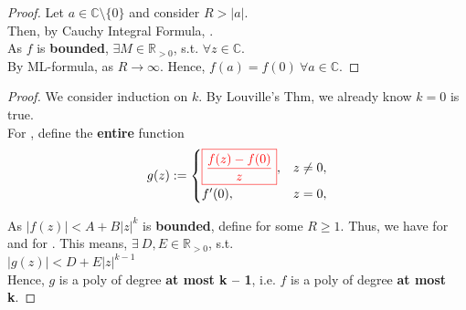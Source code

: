 \documentclass[12pt,a4paper]{article}
\begin{document}
\begin{proof}
  Let $a \in \mathbb{C} \setminus \{0\}$ and consider $R > |a|$. \\

  \noindent Then, by Cauchy Integral Formula, . \\

  \noindent As $f$ is \textbf{bounded}, $\exists M \in \mathbb{R}_{> 0}$, s.t.  $\forall z \in \mathbb{C}$. \\

  \noindent By ML-formula,  as $R \to \infty$. Hence, $\boxed{f(a) = f(0)}\ \forall a \in \mathbb{C}$.
\end{proof}


\begin{proof}
  We consider induction on $k$. By Louville's Thm, we already know $k = 0$ is true. \\

  \noindent For , define the \textbf{entire} function
  \[
    g(z) :=
    \begin{cases}
      {\textcolor{red}{\boxed{\dfrac{f(z) - f(0)}{z}}}}, & z \neq 0, \\[6pt]
      f'(0), & z = 0,
    \end{cases}
  \]

  \noindent As $|f(z)| < A + B|z|^k$ is \textbf{bounded}, define  for some $R \geq 1$. Thus, we have for  and for . This means, $\exists\ D, E \in \mathbb{R}_{>0}$, s.t. \\ $\boxed{|g(z)| < D + E|z|^{k - 1}}$ \\

  \noindent Hence, $g$ is a poly of degree \textbf{at most k -- 1}, i.e. $f$ is a poly of degree \textbf{at most k}.
\end{proof}

\end{document}

